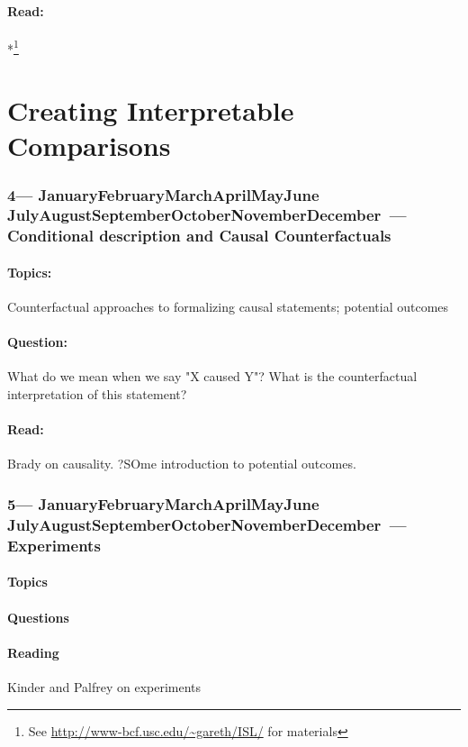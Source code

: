 \documentclass[10pt]{article}
\def\themonth{\ifcase\month\or
	January\or February\or March\or April\or May\or June\or
	July\or August\or September\or October\or November\or December\fi}
\begin{document}
\subsection{Read:}
*\citealp[Chap 3,7]{james2013introduction}\footnote{See
	\url{http://www-bcf.usc.edu/~gareth/ISL/} for materials}


\part{Creating Interpretable Comparisons}

\AdvanceDate[7]
\section{4---\themonth~\the\day---Conditional description and Causal Counterfactuals}

\subsection{Topics:} Counterfactual approaches to formalizing causal
statements; potential outcomes
\subsection{Question:} What do we mean when we say "X caused Y"? What is the
counterfactual interpretation of this statement?

\subsection{Read:}

Brady on causality.
?SOme introduction to potential outcomes.


\AdvanceDate[7]
\section{5---\themonth~\the\day---Experiments}

\subsection{Topics}
\subsection{Questions}
\subsection{Reading}
Kinder and Palfrey on experiments
\AdvanceDate[7]
\end{document}

